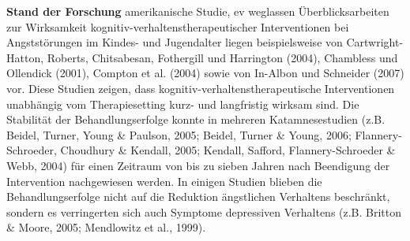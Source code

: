 \textbf{Stand der Forschung}
\cite{Chambless:2001} amerikanische Studie, ev weglassen\newline
\cite{Ortbandt:2009}   \newline
Überblicksarbeiten zur Wirksamkeit kognitiv-verhaltenstherapeutischer Interventionen bei Angststörungen im Kindes- und Jugendalter liegen beispielsweise
von Cartwright-Hatton, Roberts, Chitsabesan, Fothergill und Harrington (2004), Chambless und Ollendick (2001), Compton et al. (2004) sowie von In-Albon und Schneider (2007) vor. Diese Studien zeigen, dass kognitiv-verhaltenstherapeutische Interventionen unabhängig vom Therapiesetting kurz- und langfristig wirksam sind. Die Stabilität der Behandlungserfolge konnte in mehreren Katamnesestudien (z.B. Beidel, Turner, Young \& Paulson, 2005; Beidel, Turner \& Young, 2006; Flannery-Schroeder, Choudhury \& Kendall, 2005; Kendall, Safford, Flannery-Schroeder \& Webb, 2004) für einen Zeitraum von bis zu sieben Jahren nach Beendigung der Intervention nachgewiesen werden. In einigen Studien blieben die Behandlungserfolge nicht auf die Reduktion ängstlichen Verhaltens beschränkt, sondern es verringerten sich auch Symptome depressiven Verhaltens (z.B. Britton \& Moore, 2005; Mendlowitz et al., 1999).






